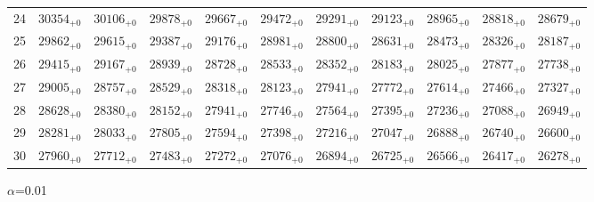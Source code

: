 \documentclass[10pt, a4paper]{article}
\begin{document}
\begin{center}
\begin{tabular}{c || c c c c c | c c c c c}
        24 & \({30354}_{+0}\) & \({30106}_{+0}\) & \({29878}_{+0}\) & \({29667}_{+0}\) & \({29472}_{+0}\) & \({29291}_{+0}\) & \({29123}_{+0}\) & \({28965}_{+0}\) & \({28818}_{+0}\) & \({28679}_{+0}\)\\
        25 & \({29862}_{+0}\) & \({29615}_{+0}\) & \({29387}_{+0}\) & \({29176}_{+0}\) & \({28981}_{+0}\) & \({28800}_{+0}\) & \({28631}_{+0}\) & \({28473}_{+0}\) & \({28326}_{+0}\) & \({28187}_{+0}\)\\
        \hline
        26 & \({29415}_{+0}\) & \({29167}_{+0}\) & \({28939}_{+0}\) & \({28728}_{+0}\) & \({28533}_{+0}\) & \({28352}_{+0}\) & \({28183}_{+0}\) & \({28025}_{+0}\) & \({27877}_{+0}\) & \({27738}_{+0}\)\\
        27 & \({29005}_{+0}\) & \({28757}_{+0}\) & \({28529}_{+0}\) & \({28318}_{+0}\) & \({28123}_{+0}\) & \({27941}_{+0}\) & \({27772}_{+0}\) & \({27614}_{+0}\) & \({27466}_{+0}\) & \({27327}_{+0}\)\\
        28 & \({28628}_{+0}\) & \({28380}_{+0}\) & \({28152}_{+0}\) & \({27941}_{+0}\) & \({27746}_{+0}\) & \({27564}_{+0}\) & \({27395}_{+0}\) & \({27236}_{+0}\) & \({27088}_{+0}\) & \({26949}_{+0}\)\\
        29 & \({28281}_{+0}\) & \({28033}_{+0}\) & \({27805}_{+0}\) & \({27594}_{+0}\) & \({27398}_{+0}\) & \({27216}_{+0}\) & \({27047}_{+0}\) & \({26888}_{+0}\) & \({26740}_{+0}\) & \({26600}_{+0}\)\\
        30 & \({27960}_{+0}\) & \({27712}_{+0}\) & \({27483}_{+0}\) & \({27272}_{+0}\) & \({27076}_{+0}\) & \({26894}_{+0}\) & \({26725}_{+0}\) & \({26566}_{+0}\) & \({26417}_{+0}\) & \({26278}_{+0}\)\\
        \hline
    \end{tabular}
    \pagebreak

    \(\alpha\)=0.01


\end{center}
\end{document}
